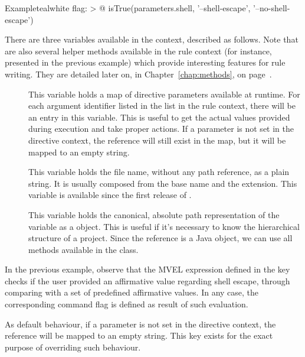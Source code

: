 \begin{description}
\begin{description}
\begin{codebox}{Example}{teal}{\icnote}{white}
flag: >
  @{
      isTrue(parameters.shell, '--shell-escape',
             '--no-shell-escape')
  }
\end{codebox}

There are three variables available in the  context, described as follows. Note that are also several helper methods available in the rule context (for instance,  presented in the previous example) which provide interesting features for rule writing. They are detailed later on, in Chapter~\ref{chap:methods}, on page~\pageref{chap:methods}.

\begin{description}
\item[] This variable holds a map of directive parameters available at runtime. For each argument identifier listed in the  list in the rule context, there will be an entry in this variable. This is useful to get the actual values provided during execution and take proper actions. If a parameter is not set in the directive context, the reference will still exist in the map, but it will be mapped to an empty string.

\item[] This variable holds the file name, without any path reference, as a plain string. It is usually composed from the base name and the extension. This variable is available since the first release of \arara.

\item[] This variable holds the canonical, absolute path representation of the  variable as a  object. This is useful if it's necessary to know the hierarchical structure of a project. Since the reference is a Java object, we can use all methods available in the  class.
\end{description}

In the previous example, observe that the \gls{MVEL} expression defined in the  key checks if the user provided an affirmative value regarding shell escape, through comparing  with a set of predefined affirmative values. In any case, the corresponding command flag is defined as result of such evaluation.

\item[\describecontext{O}{arguments}{default}] As default behaviour, if a parameter is not set in the directive context, the reference will be mapped to an empty string. This key exists for the exact purpose of overriding such behaviour.


\end{description}
\end{description}
